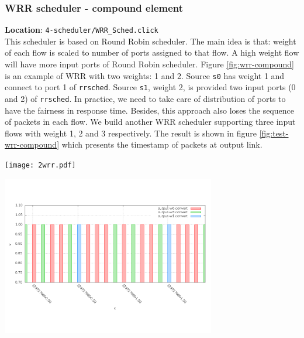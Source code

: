 \documentclass[a4paper]{article}
\begin{document}
  \subsubsection{WRR scheduler - compound element}
  \textbf{Location}: \texttt{4-scheduler/WRR\_Sched.click}\\  
  This scheduler is based on Round Robin scheduler. The main idea is that: weight of each flow is scaled to number of ports assigned to that flow. A high weight flow will have more input ports of Round Robin scheduler. Figure \ref{fig:wrr-compound} is an example of WRR with two weights: 1 and 2. Source \texttt{s0} has weight 1 and connect to port 1 of \texttt{rrsched}. Source \texttt{s1}, weight 2, is provided two input ports (0 and 2) of \texttt{rrsched}. In practice, we need to take care of distribution of ports to have the fairness in response time. Besides, this approach also loses the sequence of packets in each flow. We build another WRR scheduler supporting three input flows with weight 1, 2 and 3 respectively. The result is shown in figure \ref{fig:test-wrr-compound} which presents the timestamp of packets at output link.
  \begin{center}
	\texttt{[image: 2wrr.pdf]}
	\label{fig:wrr-compound}
  \end{center}

  \begin{center}
	\includegraphics[width=0.70\textwidth]{wrr2-dense.png}
	\label{fig:test-wrr-compound}
  \end{center}
  
\end{document}
